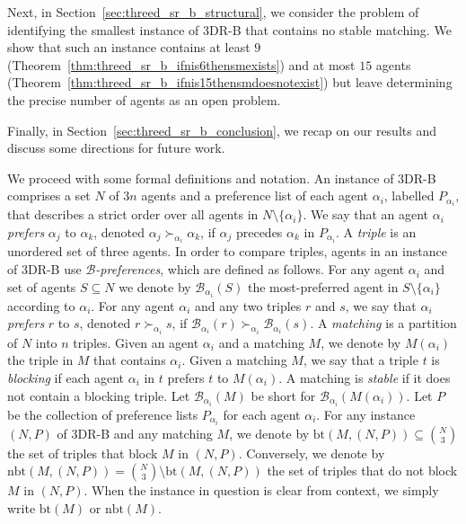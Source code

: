 Next, in Section~\ref{sec:threed_sr_b_structural}, we consider the problem of identifying the smallest instance of 3DR-B that contains no stable matching. We show that such an instance contains at least $9$ (Theorem~\ref{thm:threed_sr_b_ifnis6thensmexists}) and at most $15$ agents (Theorem~\ref{thm:threed_sr_b_ifnis15thensmdoesnotexist}) but leave determining the precise number of agents as an open problem.


Finally, in Section~\ref{sec:threed_sr_b_conclusion}, we recap on our results and discuss some directions for future work.

We proceed with some formal definitions and notation. An instance of 3DR-B comprises a set $N$ of $3n$ agents and a preference list of each agent $\alpha_i$, labelled $P_{\alpha_i}$, that describes a strict order over all agents in $N \setminus \{ \alpha_i \}$. We say that an agent $\alpha_i$ \emph{prefers} $\alpha_j$ to $\alpha_k$, denoted $\alpha_j \succ_{\alpha_i} \alpha_k$, if $\alpha_j$ precedes $\alpha_k$ in $P_{\alpha_i}$. A \emph{triple} is an unordered set of three agents. In order to compare triples, agents in an instance of 3DR-B use \emph{$\mathscr{B}$-preferences}, which are defined as follows. For any agent $\alpha_i$ and set of agents $S \subseteq N$ we denote by $\mathscr{B}_{\alpha_i}(S)$ the most-preferred agent in $S \setminus \{ \alpha_i \}$ according to $\alpha_i$. For any agent $\alpha_i$ and any two triples $r$ and $s$, we say that $\alpha_i$ \emph{prefers} $r$ to $s$, denoted $r \succ_{\alpha_i} s$, if $\mathscr{B}_{\alpha_i}(r) \succ_{\alpha_i} \mathscr{B}_{\alpha_i}(s)$. A \emph{matching} is a partition of $N$ into $n$ triples. Given an agent $\alpha_i$ and a matching $M$, we denote by $M(\alpha_i)$ the triple in $M$ that contains $\alpha_i$. Given a matching $M$, we say that a triple $t$ is \emph{blocking} if each agent $\alpha_i$ in $t$ prefers $t$ to $M(\alpha_i)$. A matching is \emph{stable} if it does not contain a blocking triple. Let $\mathscr{B}_{\alpha_i}(M)$ be short for $\mathscr{B}_{\alpha_i}(M(\alpha_i))$. Let $P$ be the collection of preference lists  $P_{\alpha_i}$ for each agent $\alpha_i$. For any instance $(N, P)$ of 3DR-B and any matching $M$, we denote by $\textrm{bt}(M, (N, P)) \subseteq \binom{N}{3}$ the set of triples that block $M$ in $(N, P)$. Conversely, we denote by $\textrm{nbt}(M, (N, P)) = \binom{N}{3} \setminus \textrm{bt}(M, (N, P))$ the set of triples that do not block $M$ in $(N, P)$. When the instance in question is clear from context, we simply write $\textrm{bt}(M)$ or $\textrm{nbt}(M)$. 